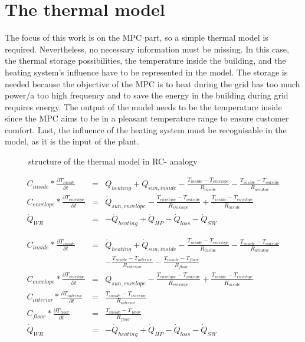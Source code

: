 \section{The thermal model}
\label{thermalmodel}

    The focus of this work is on the MPC part, so a simple thermal model is required. Nevertheless, no necessary information must be missing. In this case, the thermal storage possibilities, the temperature inside the building, and the heating system's influence have to be represented in the model. The storage is needed because the objective of the MPC is to heat during the grid has too much power/a too high frequency and to save the energy in the building during grid requires energy. The output of the model needs to be the temperature inside since the MPC aims to be in a pleasant temperature range to ensure customer comfort. Last, the influence of the heating system must be recognisable in the model, as it is the input of the plant. 
    \newline
    \begin{figure}
        \centering
        \def\svgwidth{320pt}
        
        \caption{structure of the thermal model in RC- analogy}
        \label{fig:structureThermalModel}
    \end{figure}
    \begin{align}
       \label{eq:meinModel} 
       C_{inside}*\frac{\partial T_{inside}}{\partial t} &=& \dot{Q}_{heating} + \dot{Q}_{sun,inside} - \frac{T_{inside}-T_{envelope}}{R_{inside}} - \frac{T_{inside}-T_{outside}}{R_{window}}\\
       C_{envelope}*\frac{\partial T_{envelope}}{\partial t} &=& \dot{Q}_{sun,envelope} - \frac{T_{envelope}-T_{outside}}{R_{envelope}} + \frac{T_{inside}-T_{envelope}}{R_{inside}} \nonumber \\
       \dot{Q}_{WR}&=& -\dot{Q}_{heating} + \dot{Q}_{HP} - \dot{Q}_{loss} - \dot{Q}_{SW} \nonumber
    \end{align}
    
    \begin{align}
       \label{eq:meinModel2} 
       C_{inside}*\frac{\partial T_{inside}}{\partial t} &=& \dot{Q}_{heating} + \dot{Q}_{sun,inside} - \frac{T_{inside}-T_{envelope}}{R_{inside}} - \frac{T_{inside}-T_{outside}}{R_{window}} \nonumber\\
       & &-\frac{T_{inside}-T_{interior}}{R_{interior}}-\frac{T_{inside}-T_{floor}}{R_{floor}} \nonumber\\
       C_{envelope}*\frac{\partial T_{envelope}}{\partial t} &=& \dot{Q}_{sun,envelope} - \frac{T_{envelope}-T_{outside}}{R_{envelope}} + \frac{T_{inside}-T_{envelope}}{R_{inside}} \nonumber \\
       C_{interior}*\frac{\partial T_{interior}}{\partial t} &=& \frac{T_{inside}-T_{interior}}{R_{interior}} \nonumber\\
       C_{floor}*\frac{\partial T_{floor}}{\partial t} &=& \frac{T_{inside}-T_{floor}}{R_{floor}} \nonumber\\
       \dot{Q}_{WR}&=& -\dot{Q}_{heating} + \dot{Q}_{HP} - \dot{Q}_{loss} - \dot{Q}_{SW} \nonumber
    \end{align}


